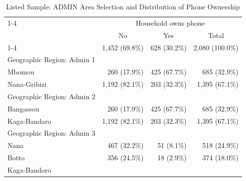 \begin{table}[!h]
\caption{Listed Sample: ADMIN Area Selection and Distribution of Phone Ownership}
\centering
\begin{tabular}{llll}
\cline{1-4}
\multicolumn{1}{r}{} &
  \multicolumn{3}{c}{Household owns phone} \\
\multicolumn{1}{r}{} &
  \multicolumn{1}{c}{No} &
  \multicolumn{1}{c}{Yes} &
  \multicolumn{1}{c}{Total} \\
\cline{1-4}
\multicolumn{1}{l}{N} &
  \multicolumn{1}{r}{1,452 (69.8\%)} &
  \multicolumn{1}{r}{628 (30.2\%)} &
  \multicolumn{1}{r}{2,080 (100.0\%)} \\
\multicolumn{1}{l}{Geographic Region: Admin 1} &
  \multicolumn{1}{r}{} &
  \multicolumn{1}{r}{} &
  \multicolumn{1}{r}{} \\
\multicolumn{1}{l}{\hspace{1em}Mbomou} &
  \multicolumn{1}{r}{260 (17.9\%)} &
  \multicolumn{1}{r}{425 (67.7\%)} &
  \multicolumn{1}{r}{685 (32.9\%)} \\
\multicolumn{1}{l}{\hspace{1em}Nana-Gribizi} &
  \multicolumn{1}{r}{1,192 (82.1\%)} &
  \multicolumn{1}{r}{203 (32.3\%)} &
  \multicolumn{1}{r}{1,395 (67.1\%)} \\
\multicolumn{1}{l}{Geographic Region: Admin 2} &
  \multicolumn{1}{r}{} &
  \multicolumn{1}{r}{} &
  \multicolumn{1}{r}{} \\
\multicolumn{1}{l}{\hspace{1em}Bangassou} &
  \multicolumn{1}{r}{260 (17.9\%)} &
  \multicolumn{1}{r}{425 (67.7\%)} &
  \multicolumn{1}{r}{685 (32.9\%)} \\
\multicolumn{1}{l}{\hspace{1em}Kaga-Bandaro} &
  \multicolumn{1}{r}{1,192 (82.1\%)} &
  \multicolumn{1}{r}{203 (32.3\%)} &
  \multicolumn{1}{r}{1,395 (67.1\%)} \\
\multicolumn{1}{l}{Geographic Region: Admin 3} &
  \multicolumn{1}{r}{} &
  \multicolumn{1}{r}{} &
  \multicolumn{1}{r}{} \\
\multicolumn{1}{l}{\hspace{1em}Nana} &
  \multicolumn{1}{r}{467 (32.2\%)} &
  \multicolumn{1}{r}{51 (8.1\%)} &
  \multicolumn{1}{r}{518 (24.9\%)} \\
\multicolumn{1}{l}{\hspace{1em}Botto} &
  \multicolumn{1}{r}{356 (24.5\%)} &
  \multicolumn{1}{r}{18 (2.9\%)} &
  \multicolumn{1}{r}{374 (18.0\%)} \\
\multicolumn{1}{l}{\hspace{1em}Kaga-Bandoro} &

\end{tabular}
\end{table}
